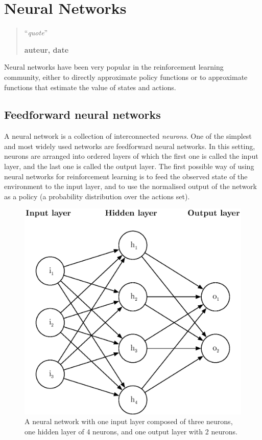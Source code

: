 \chapter{Neural Networks}
\begin{quotation}
\noindent ``\emph{quote}''
\begin{flushright}\textbf{auteur, date}\end{flushright}
\end{quotation}

\vspace*{0.5cm}


Neural networks have been very popular in the reinforcement learning community,
either to directly approximate policy functions or to approximate functions that
estimate the value of states and actions.\\

\section{Feedforward neural networks}
A neural network is a collection of interconnected \textit{neurons}. One of the
simplest and most widely used networks are feedforward neural networks. In this
setting, neurons are arranged into ordered layers of which the first one is
called the input layer, and the last one is called the output layer.
The first possible way of using neural networks for reinforcement learning
is to feed the observed state of the environment to the input layer, and to
use the normalised output of the network as a policy (a probability distribution
over the actions set).

\begin{figure}[]
	\centering
	\includegraphics[width=0.6\linewidth]{fig/neural_network.eps}
	\caption{A neural network with one input layer composed of three neurons,
	one hidden layer of 4 neurons, and one output layer with 2 neurons.}
	\label{fig:neural_network}
\end{figure}


